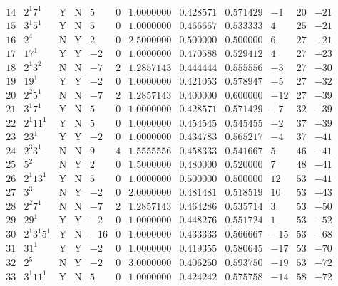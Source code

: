 \documentclass[11pt,reqno,a4letter]{article}
\numberwithin{figure}{section}
\numberwithin{table}{section}
\theoremstyle{plain}
\numberwithin{theorem}{section}
\theoremstyle{definition}
\begin{document}
\begin{table}[ht!]
\begin{equation*}
{\begin{array}{cc|cc|ccc|cc|ccc}
 14 & 2^1 7^1 & \text{Y} & \text{N} & 5 & 0 & 1.0000000 & 0.428571 & 0.571429 & -1 & 20 & -21 \\
 15 & 3^1 5^1 & \text{Y} & \text{N} & 5 & 0 & 1.0000000 & 0.466667 & 0.533333 & 4 & 25 & -21 \\
 16 & 2^4 & \text{N} & \text{Y} & 2 & 0 & 2.5000000 & 0.500000 & 0.500000 & 6 & 27 & -21 \\
 17 & 17^1 & \text{Y} & \text{Y} & -2 & 0 & 1.0000000 & 0.470588 & 0.529412 & 4 & 27 & -23 \\
 18 & 2^1 3^2 & \text{N} & \text{N} & -7 & 2 & 1.2857143 & 0.444444 & 0.555556 & -3 & 27 & -30 \\
 19 & 19^1 & \text{Y} & \text{Y} & -2 & 0 & 1.0000000 & 0.421053 & 0.578947 & -5 & 27 & -32 \\
 20 & 2^2 5^1 & \text{N} & \text{N} & -7 & 2 & 1.2857143 & 0.400000 & 0.600000 & -12 & 27 & -39 \\
 21 & 3^1 7^1 & \text{Y} & \text{N} & 5 & 0 & 1.0000000 & 0.428571 & 0.571429 & -7 & 32 & -39 \\
 22 & 2^1 11^1 & \text{Y} & \text{N} & 5 & 0 & 1.0000000 & 0.454545 & 0.545455 & -2 & 37 & -39 \\
 23 & 23^1 & \text{Y} & \text{Y} & -2 & 0 & 1.0000000 & 0.434783 & 0.565217 & -4 & 37 & -41 \\
 24 & 2^3 3^1 & \text{N} & \text{N} & 9 & 4 & 1.5555556 & 0.458333 & 0.541667 & 5 & 46 & -41 \\
 25 & 5^2 & \text{N} & \text{Y} & 2 & 0 & 1.5000000 & 0.480000 & 0.520000 & 7 & 48 & -41 \\
 26 & 2^1 13^1 & \text{Y} & \text{N} & 5 & 0 & 1.0000000 & 0.500000 & 0.500000 & 12 & 53 & -41 \\
 27 & 3^3 & \text{N} & \text{Y} & -2 & 0 & 2.0000000 & 0.481481 & 0.518519 & 10 & 53 & -43 \\
 28 & 2^2 7^1 & \text{N} & \text{N} & -7 & 2 & 1.2857143 & 0.464286 & 0.535714 & 3 & 53 & -50 \\
 29 & 29^1 & \text{Y} & \text{Y} & -2 & 0 & 1.0000000 & 0.448276 & 0.551724 & 1 & 53 & -52 \\
 30 & 2^1 3^1 5^1 & \text{Y} & \text{N} & -16 & 0 & 1.0000000 & 0.433333 & 0.566667 & -15 & 53 & -68 \\
 31 & 31^1 & \text{Y} & \text{Y} & -2 & 0 & 1.0000000 & 0.419355 & 0.580645 & -17 & 53 & -70 \\
 32 & 2^5 & \text{N} & \text{Y} & -2 & 0 & 3.0000000 & 0.406250 & 0.593750 & -19 & 53 & -72 \\
 33 & 3^1 11^1 & \text{Y} & \text{N} & 5 & 0 & 1.0000000 & 0.424242 & 0.575758 & -14 & 58 & -72 \\

\end{array}}
\end{equation*}
\end{table}
\end{document}
